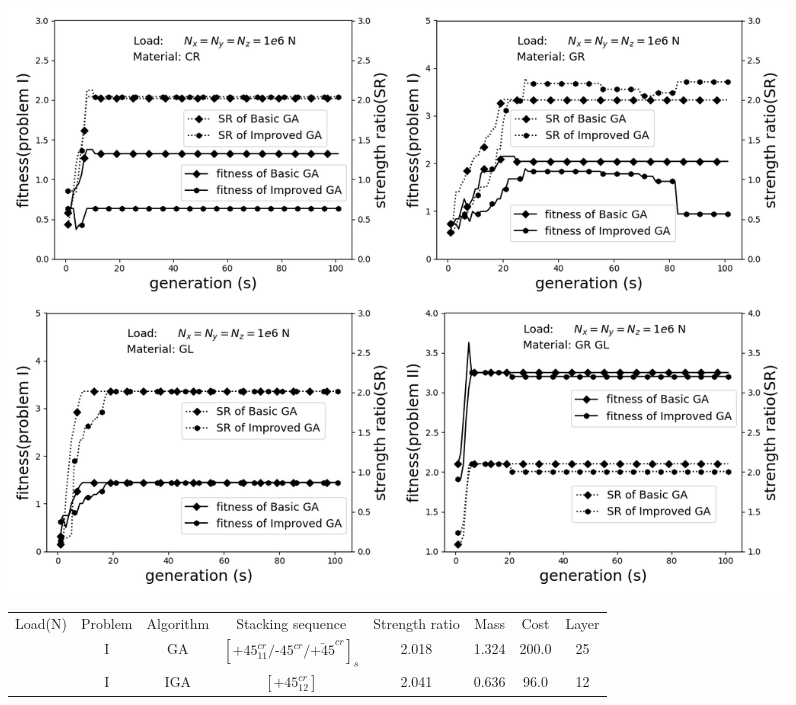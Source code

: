 \documentclass[Afour,sageh,times]{sagej}
\begin{document}
\begin{figure}

\begin{center}
  \includegraphics[width=\linewidth]{A_laminate_design_images/NxNyNz.png}
  \label{fig:NxNyNz}
\end{center}

\begin{center}  
	\begin{tabular}{cccccccc}
	\toprule
	Load(N)                                                 &  Problem  &   Algorithm      & Stacking sequence                                    & Strength ratio  & Mass  &  Cost   & Layer    \\ 
	  &  I  & GA   &  $[\text{+}45_{11}^{cr}/\text{-}45^{cr}/\bar{\text{+}45}^{cr}]_s$                            & 2.018           & 1.324 &  200.0  & 25  \\
	                                                                             &  I  & IGA  &  $[\text{+}45_{12}^{cr}]$                            & 2.041           & 0.636 &  96.0  & 12  \\


\end{tabular}
\end{center}
\end{figure}
\end{document}
